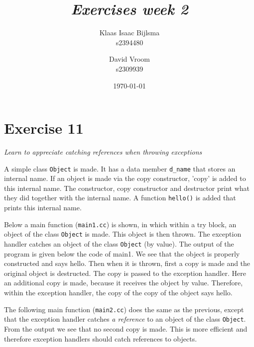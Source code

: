\documentclass[12pt]{article}
\title{\itshape Exercises week 2}
\author{
	Klaas Isaac Bijlsma \\ s2394480
	\and
	David Vroom \\ s2309939
}
\date{\today}
\newcommand{\desc}[1]{\textit{#1} \vspace{1em}}
\begin{document}
\maketitle

\section*{Exercise 11}
\desc{Learn to appreciate catching references when throwing exceptions}

A simple class \texttt{Object} is made. It has a data member \texttt{d\_name} that stores an internal name. If an object is made via the copy constructor, 'copy' is added to this internal name. The constructor, copy constructor and destructor print what they did together with the internal name. A function \texttt{hello()} is added that prints this internal name. 







\vspace{1cm}
Below a main function (\texttt{main1.cc}) is shown, in which within a try block, an object of the class \texttt{Object} is made. This object is then thrown. The exception handler catches an object of the class \texttt{Object} (by value). The output of the program is given below the code of main1. We see that the object is properly constructed and says hello. Then when it is thrown, first a copy is made and the original object is destructed. The copy is passed to the exception handler. Here an additional copy is made, because it receives the object by value. Therefore, within the exception handler, the copy of the copy of the object says hello.



\vspace{1cm}
The following main function (\texttt{main2.cc}) does the same as the previous, except that the exception handler catches \emph{a reference} to an object of the class \texttt{Object}. From the output we see that no second copy is made. This is more efficient and therefore exception handlers should catch references to objects. 


\end{document}
